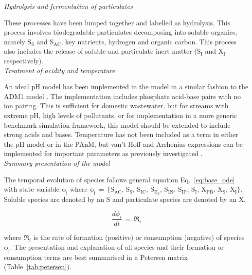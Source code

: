 \noindent\textit{Hydrolysis and fermentation of particulates}\par
\noindent These processes have been lumped together and labelled as hydrolysis. This process involves biodegradable particulates decomposing into soluble organics, namely $\mathrm{S_S}$ and $\mathrm{S_{AC}}$, key nutrients, hydrogen and organic carbon. This process also includes the release of soluble and particulate inert matter ($\mathrm{S_I}$ and $\mathrm{X_{I}}$ respectively). \\

\noindent\textit{Treatment of acidity and temperature}\par
\noindent An ideal pH model has been implemented in the model in a similar fashion to the ADM1 model \cite{Batstone2002}. The implementation includes phosphate acid-base pairs with no ion pairing. This is sufficient for domestic wastewater, but for streams with extreme pH, high levels of pollutants, or for implementation in a more generic benchmark simulation framework, this model should be extended to include strong acids and bases. Temperature has not been included as a term in either the pH model or in the PAnM, but van't Hoff and Arrhenius expressions can be implemented for important parameters as previously investigated \cite{Hulsen2016a}. \\

\noindent\textit{Summary presentation of the model}\par
\noindent The temporal evolution of species follows general equation Eq.~\eqref{eq:base_ode} with state variable $\mathrm{\phi_i}$ where $\mathrm{\phi_i\, = \, \{S_{AC},\, S_S,\, S_{IC},\, S_{H_2},\, S_{IN},\, S_{IP},\, S_{I},\, X_{PB},\, X_{S},\, X_{I}\}}$. Soluble species are denoted by an $\mathrm{S}$ and particulate species are denoted by an $\mathrm{X}$.

\begin{equation}
    \label{eq:base_ode}
    \frac{d\phi_i}{dt} \, = \, \mathfrak{R}_i
\end{equation}

where $\mathfrak{R}_i$ is the rate of formation (positive) or consumption (negative) of species $\mathrm{\phi_i}$. The presentation and explanation of all species and their formation or consumption terms are best summarised in a Petersen matrix (Table~\ref{tab:petersen}).

